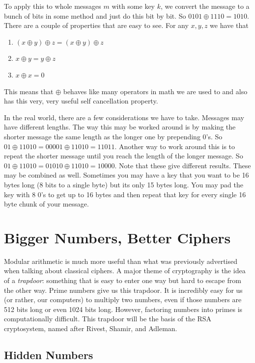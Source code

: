 \documentclass[letterpaper]{article}
\begin{document}
To apply this to whole messages $m$ with some key $k$, we convert the message to a bunch of bits in some method and just do this bit by bit.
So $0101 \oplus 1110 = 1010$.
There are a couple of properties that are easy to see.
For any $x, y, z$ we have that
\begin{enumerate}
\item $(x \oplus y) \oplus z = (x \oplus y) \oplus z$
\item $x \oplus y = y \oplus z$
\item $x \oplus x = 0$
\end{enumerate}
This means that $\oplus$ behaves like many operators in math we are used to and also has this very, very useful self cancellation property.

In the real world, there are a few considerations we have to take.
Messages may have different lengths.
The way this may be worked around is by making the shorter message the same length as the longer one by prepending $0$'s.
So $01 \oplus 11010 = 00001 \oplus 11010 = 11011$.
Another way to work around this is to repeat the shorter message until you reach the length of the longer message.
So $01 \oplus 11010 = 01010 \oplus 11010 = 10000$.
Note that these give different results.
These may be combined as well.
Sometimes you may have a key that you want to be 16 bytes long (8 bits to a single byte) but its only 15 bytes long.
You may pad the key with 8 0's to get up to 16 bytes and then repeat that key for every single 16 byte chunk of your message.

\section*{Bigger Numbers, Better Ciphers}

Modular arithmetic is much more useful than what was previously advertised when talking about classical ciphers.
A major theme of cryptography is the idea of a \emph{trapdoor}: something that is easy to enter one way but hard to escape from the other way.
Prime numbers give us this trapdoor.
It is incredibly easy for us (or rather, our computers) to multiply two numbers, even if those numbers are 512 bits long or even 1024 bits long.
However, factoring numbers into primes is computationally difficult.
This trapdoor will be the basis of the RSA cryptosystem, named after Rivest, Shamir, and Adleman.

\subsection*{Hidden Numbers}
\end{document}
